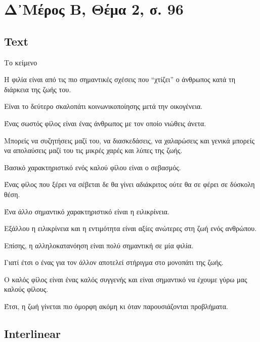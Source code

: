 \documentclass[extrafontsizes,17pt]{memoir}
\begin{document}
\chapter{Δ᾽Μέρος Β, Θέμα 2, σ. 96}

\section{Text}

\pex Το κείμενο

\a

Η φιλία είναι από τις πιο σημαντικές σχέσεις που “χτίζει” ο άνθρωπος κατά τη διάρκεια της ζωής του. 

\a

Είναι το δεύτερο σκαλοπάτι κοινωνικοποίησης μετά την οικογένεια.

\a

Ένας σωστός φίλος είναι ένας άνθρωπος με τον οποίο νιώθεις άνετα. 

\a

Μπορείς να συζητήσεις μαζί του, να διασκεδάσεις, να χαλαρώσεις και γενικά μπορείς να απολαύσεις μαζί του τις μικρές χαρές και λύπες της ζωής. 

\a 

Βασικό χαρακτηριστικό ενός καλού φίλου είναι ο σεβασμός. 

\a

Ένας φίλος που ξέρει να σέβεται δε θα γίνει αδιάκριτος ούτε θα σε φέρει σε δύσκολη θέση. 

\a

Ένα άλλο σημαντικό χαρακτηριστικό είναι η ειλικρίνεια. 

\a 

Εξάλλου η ειλικρίνεια και η εντιμότητα είναι αξίες ανώτερες στη ζωή ενός ανθρώπου. 

\a

Επίσης, η αλληλοκατανόηση είναι πολύ σημαντική σε μία φιλία. 

\a

Γιατί έτσι ο ένας για τον άλλον αποτελεί στήριγμα στο μονοπάτι της ζωής.

\a

Ο καλός φίλος είναι ένας καλός συγγενής και είναι σημαντικό να έχουμε γύρω μας καλούς φίλους. 

\a

Έτσι, η ζωή γίνεται πιο όμορφη ακόμη κι όταν παρουσιάζονται προβλήματα.

\xe

\section{Interlinear}
\end{document}
